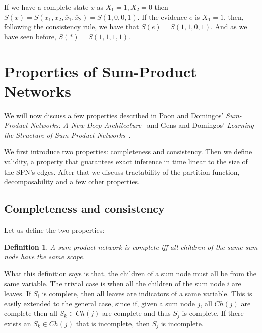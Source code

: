 \documentclass[a4paper,10pt]{article}
\theoremstyle{plain}
\newtheorem*{spn-def}{Definition}
\begin{document}
If we have a complete state $x$ as $X_1=1,X_2=0$ then $S(x)=S(x_1,x_2,\overline{x}_1,
\overline{x}_2)=S(1,0,0,1)$. If the evidence $e$ is $X_1=1$, then, following the consistency rule,
we have that $S(e)=S(1,1,0,1)$. And as we have seen before, $S(*)=S(1,1,1,1)$.

\newpage

\section{Properties of Sum-Product Networks}

We will now discuss a few properties described in Poon and Domingos' \textit{Sum-Product Networks:
A New Deep Architecture}~\cite{poon-domingos} and Gens and Domingos' \textit{Learning the Structure
of Sum-Product Networks}~\cite{gens-domingos}.

We first introduce two properties: completeness and consistency. Then we define validity, a
property that guarantees exact inference in time linear to the size of the SPN's edges. After that
we discuss tractability of the partition function, decomposability and a few other properties.

\subsection{Completeness and consistency}

Let us define the two properties:

\begin{spn-def}
  A sum-product network is complete iff all children of the same sum node have the same scope.
\end{spn-def}

What this definition says is that, the children of a sum node must all be from the same variable.
The trivial case is when all the children of the sum node $i$ are leaves. If $S_i$ is complete,
then all leaves are indicators of a same variable. This is easily extended to the general case,
since if, given a sum node $j$, all $Ch(j)$ are complete then all $S_k\in Ch(j)$ are complete and
thus $S_j$ is complete. If there exists an $S_k\in Ch(j)$ that is incomplete, then $S_j$ is
incomplete.
\end{document}
